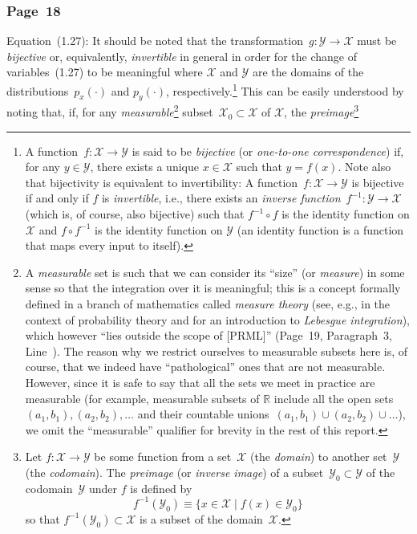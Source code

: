\documentclass[12pt,a4paper]{article}
\newcommand{\erratum}[1]{%
\subsubsection*{#1}
\addcontentsline{toc}{subsection}{#1}}
\begin{document}
\erratum{Page~18}
Equation~(1.27):
It should be noted that
the transformation~$g : \mathcal{Y} \to \mathcal{X}$ must be \emph{bijective} or, equivalently,
\emph{invertible} in general in order for the change of variables~(1.27) to be meaningful
where $\mathcal{X}$ and $\mathcal{Y}$ are the domains of
the distributions~$p_x(\cdot)$ and $p_y(\cdot)$, respectively.\footnote{%
A function~$f : \mathcal{X} \to \mathcal{Y}$ is said to be \emph{bijective}
(or \emph{one-to-one correspondence})
if, for any $y \in \mathcal{Y}$, there exists a unique $x \in \mathcal{X}$ such that $y = f(x)$.
Note also that bijectivity is equivalent to invertibility:
A function~$f : \mathcal{X} \to \mathcal{Y}$ is bijective if and only if $f$ is \emph{invertible},
i.e., there exists an \emph{inverse function}~$f^{-1} : \mathcal{Y} \to \mathcal{X}$
(which is, of course, also bijective)
such that $f^{-1} \circ f$ is the identity function on $\mathcal{X}$
and $f \circ f^{-1}$ is the identity function on $\mathcal{Y}$
(an identity function is a function that maps every input to itself).}
This can be easily understood by noting that,
if, for any \emph{measurable}\footnote{%
A \emph{measurable} set is such that
we can consider its ``size'' (or \emph{measure}) in some sense
so that the integration over it is meaningful;
this is a concept formally defined in a branch of mathematics called \emph{measure theory}
(see, e.g., \citet{Feller:ProbabilityTheory2} in the context of probability theory
and \citet{Tao:MeasureTheory} for an introduction to \emph{Lebesgue integration}),
which however ``lies outside the scope of [PRML]'' (Page~19, Paragraph~3, Line~).
The reason why we restrict ourselves to measurable subsets here is, of course, that
we indeed have ``pathological'' ones that are not measurable.
However, since it is safe to say that all the sets we meet in practice are measurable
(for example, measurable subsets of $\mathbb{R}$ include
all the open sets~$(a_1, b_1), (a_2, b_2), \dots$ and
their countable unions~$(a_1, b_1) \cup (a_2, b_2) \cup \dots$),
we omit the ``measurable'' qualifier for brevity in the rest of this report.}
subset~$\mathcal{X}_0 \subset \mathcal{X}$ of $\mathcal{X}$,
the \emph{preimage}\footnote{%
Let $f : \mathcal{X} \to \mathcal{Y}$ be some function
from a set~$\mathcal{X}$ (the \emph{domain})
to another set~$\mathcal{Y}$ (the \emph{codomain}).
The \emph{preimage} (or \emph{inverse image}) of
a subset~$\mathcal{Y}_0 \subset \mathcal{Y}$ of the codomain~$\mathcal{Y}$
under $f$ is defined by
\begin{equation}
f^{-1}(\mathcal{Y}_0) \equiv \{ x \in \mathcal{X} \mid f(x) \in \mathcal{Y}_0 \}
\end{equation}
so that $f^{-1}(\mathcal{Y}_0) \subset \mathcal{X}$ is a subset of the domain~$\mathcal{X}$.}~%
\end{document}
